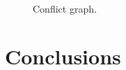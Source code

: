 \documentclass{acm_proc_article-sp}          %
\begin{document}
\begin{figure}[ht]
  \centering
  \\
  \caption{Conflict graph.}\label{fig:conflict}
\end{figure}


\section{Conclusions}
\label{sec:conclusions}



\end{document}
